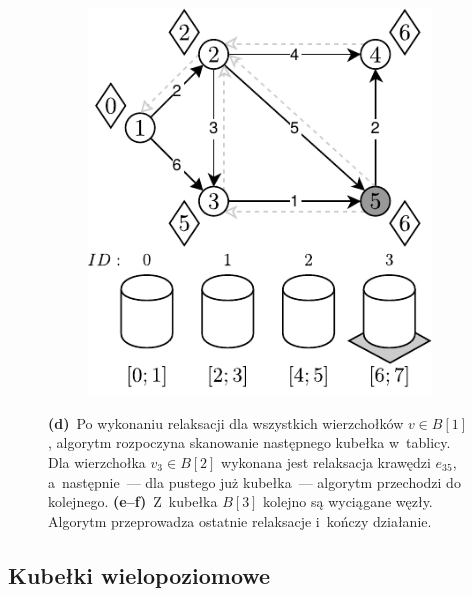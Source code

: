 \begin{figure}[!htbp]
\begin{subfigure}[b]{0.3\textwidth}
		\caption{}
		\label{fig:exampleAproximateBuckets:e}
	\end{subfigure}
	\hfill
	\begin{subfigure}[b]{0.3\textwidth}
		\includegraphics[width=\textwidth]{Chapter_II/APROXIMATE-BUCKETS-Example/f.pdf}
		\caption{}
		\label{fig:exampleAproximateBuckets:f}
	\end{subfigure}
	\hfill\null
	\caption{
		\textbf{(d)}~Po wykonaniu relaksacji dla wszystkich wierzchołków $v \in B \left[ 1 \right]$, algorytm rozpoczyna skanowanie następnego kubełka w~tablicy.
		Dla wierzchołka $v_{3} \in B \left[ 2 \right]$ wykonana jest relaksacja krawędzi $e_{35}$, a~następnie~--- dla pustego już kubełka~--- algorytm przechodzi do kolejnego.
		\textbf{(e--f)}~Z~kubełka $ B \left[ 3 \right]$ kolejno są wyciągane węzły.
		Algorytm przeprowadza ostatnie relaksacje i~kończy działanie.
	}
	\label{fig:exampleAproximateBucketsB}
\end{figure}



\subsection{Kubełki wielopoziomowe}



